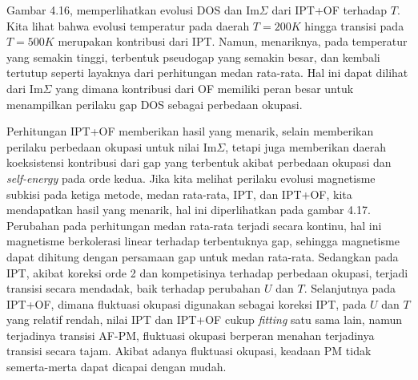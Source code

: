 Gambar 4.16, memperlihatkan evolusi DOS dan $\text{Im}\Sigma$ dari IPT+OF terhadap $T$. Kita lihat bahwa evolusi temperatur pada daerah $T = 200 K$ hingga transisi pada $T = 500K$ merupakan kontribusi dari IPT. Namun, menariknya, pada temperatur yang semakin tinggi, terbentuk pseudogap yang semakin besar, dan kembali tertutup seperti layaknya dari perhitungan medan rata-rata. Hal ini dapat dilihat dari $\text{Im}\Sigma$ yang dimana kontribusi dari OF memiliki peran besar untuk menampilkan perilaku gap DOS sebagai perbedaan okupasi.

Perhitungan IPT+OF memberikan hasil yang menarik, selain memberikan perilaku perbedaan okupasi untuk nilai $\text{Im}\Sigma$, tetapi juga memberikan daerah koeksistensi kontribusi dari gap yang terbentuk akibat perbedaan okupasi dan \textit{self-energy} pada orde kedua. Jika kita melihat perilaku evolusi magnetisme subkisi pada ketiga metode, medan rata-rata, IPT, dan IPT+OF, kita mendapatkan hasil yang menarik, hal ini diperlihatkan pada gambar 4.17. Perubahan pada perhitungan medan rata-rata terjadi secara kontinu, hal ini magnetisme berkolerasi linear terhadap terbentuknya gap, sehingga magnetisme dapat dihitung dengan persamaan gap untuk medan rata-rata\cite{staudt}. Sedangkan pada IPT, akibat koreksi orde 2 dan kompetisinya terhadap perbedaan okupasi, terjadi transisi secara mendadak, baik terhadap perubahan $U$ dan $T$. Selanjutnya pada IPT+OF, dimana fluktuasi okupasi digunakan sebagai koreksi IPT, pada $U$ dan $T$ yang relatif rendah, nilai IPT dan IPT+OF cukup \textit{fitting} satu sama lain, namun terjadinya transisi AF-PM, fluktuasi okupasi berperan menahan terjadinya transisi secara tajam. Akibat adanya fluktuasi okupasi, keadaan PM tidak semerta-merta dapat dicapai dengan mudah.


